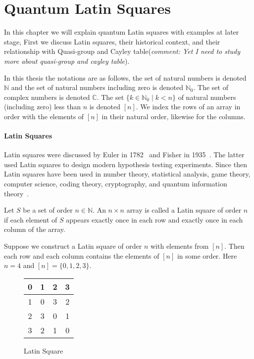 \chapter{Quantum Latin Squares}

In this chapter we will explain quantum Latin squares with examples at later stage, First we discuss Latin squares, their historical context, and their relationship with Quasi-group and Cayley table(\textit{comment: Yet I need to study more about quasi-group and cayley table}). 

In this thesis the notations are as follows, the set of natural numbers is denoted $\mathbb{N}$ and the set of natural numbers including zero is denoted $\mathbb{N}_0$.
The set of complex numbers is denoted $\mathbb{C}$.
The set $\{ k \in \mathbb{N}_0 \mid k < n \}$ of natural numbers (including zero) less than $n$ is denoted $[n]$.
We index the rows of an array in order with the elements of $[n]$ in their natural order, likewise for the columns.


\subsubsection{Latin Squares}

Latin squares were discussed by Euler in 1782~\cite{macneish1922EulerSquares} and Fisher in 1935~\cite{fisher1960DesignExperiments}.
The latter used Latin squares to design modern hypothesis testing experiments.
Since then Latin squares have been used in number theory, statistical analysis, game theory, computer science, coding theory, cryptography, and quantum information theory~\cite{keedwell2015LatinSquaresTheir}.

\begin{definition}
  Let $S$ be a set of order $n \in \mathbb{N}$.
  An $n \times n$ array is called a Latin square of order $n$ if each element of $S$ appears exactly once in each row and exactly once in each column of the array.
\end{definition}

Suppose we construct a Latin square of order $n$ with elements from $[n]$.
Then each row and each column contains the elements of $[n]$ in some order. Here $n = 4$ and $[n]=\{0,1,2,3\}$. 

\begin{figure}[H]
  \centering
  \begin{tabular}{|c|c|c|c|}
    \hline
    0 & 1 & 2 & 3 \\
    \hline
    1 & 0 & 3 & 2 \\
    \hline
    2 & 3 & 0 & 1 \\
    \hline
    3 & 2 & 1 & 0 \\
    \hline
  \end{tabular}
  \caption{Latin Square}
  \label{fig:latin_square}
\end{figure}

